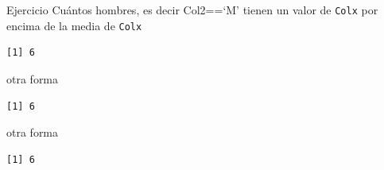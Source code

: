 \documentclass[
  ignorenonframetext,
  aspectratio=169,
  spanish,
]{beamer}
\newenvironment{Shaded}{\begin{snugshade}}{\end{snugshade}}
\newcommand{\FunctionTok}[1]{\textcolor[rgb]{0.28,0.35,0.67}{#1}}
\newcommand{\NormalTok}[1]{\textcolor[rgb]{0.00,0.23,0.31}{#1}}
\newcommand{\SpecialCharTok}[1]{\textcolor[rgb]{0.37,0.37,0.37}{#1}}
\newcommand{\StringTok}[1]{\textcolor[rgb]{0.13,0.47,0.30}{#1}}
\begin{document}
\begin{frame}[fragile]{Ejercicio}
\label{ejercicio-4}
Cuántos hombres, es decir Col2==`M' tienen un valor de \texttt{Colx} por
encima de la media de \texttt{Colx}

\begin{Shaded}
\end{Shaded}

\begin{verbatim}
[1] 6
\end{verbatim}
\end{frame}

\begin{frame}[fragile]{otra forma}
\label{otra-forma}
\begin{Shaded}
\end{Shaded}

\begin{verbatim}
[1] 6
\end{verbatim}
\end{frame}

\begin{frame}[fragile]{otra forma}
\label{otra-forma-1}
\begin{Shaded}
\end{Shaded}

\begin{verbatim}
[1] 6
\end{verbatim}
\end{frame}
\end{document}
